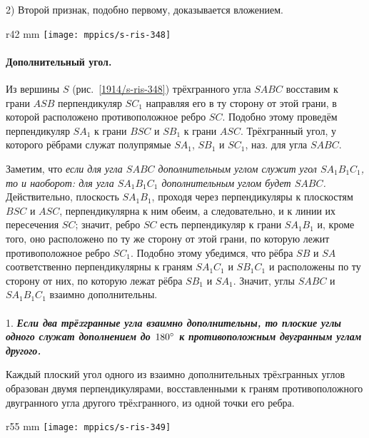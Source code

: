 2) Второй признак, подобно первому, доказывается вложением.

\begin{wrapfigure}{r}{42 mm}
\vskip0mm
\centering
\texttt{[image: mppics/s-ris-348]}
\caption{}\label{1914/s-ris-348}
\end{wrapfigure}

\paragraph{Дополнительный угол.}\label{1914/399}
Из вершины $S$ (рис.~\ref{1914/s-ris-348}) трёхгранного угла $SABC$ восставим к грани $ASB$ перпендикуляр $SC_1$ направляя его в ту сторону от этой грани, в которой расположено противоположное ребро $SC$.
Подобно этому проведём перпендикуляр $SA_1$ к грани $BSC$ и $SB_1$ к грани $ASC$. Трёхгранный угол, у которого рёбрами служат полупрямые $SA_1$, $SB_1$ и $SC_1$, наз.  для угла $SABC$.

Заметим, что \emph{если для угла $SABC$ дополнительным углом служит угол $SA_1B_1C_1$, то и наоборот: для угла $SA_1B_1C_1$ дополнительным углом будет $SABC$.}
Действительно, плоскость $SA_1B_1$, проходя через перпендикуляры к плоскостям $BSC$ и $ASC$, перпендикулярна к ним обеим, а следовательно, и к линии их пересечения $SC$; значит, ребро $SC$ есть перпендикуляр к грани $SA_1B_1$ и, кроме того, оно расположено по ту же сторону от этой грани, по которую лежит противоположное ребро $SC_1$.
Подобно этому убедимся, что рёбра $SB$ и $SA$ соответственно перпендикулярны к граням $SA_1C_1$ и $SB_1C_1$ и расположены по ту сторону от них, по которую лежат рёбра $SB_1$ и $SA_1$.
Значит, углы $SABC$ и $SA_1B_1C_1$ взаимно дополнительны.

\paragraph{}\label{1914/400}
 1.
\textbf{\emph{Если два трёxгранные угла взаимно дополнительны, то плоские углы одного служат дополнением до $180\degree$ к противоположным двугранным углам другого.}}

Каждый плоский угол одного из взаимно дополнительных трёxгранных углов образован двумя перпендикулярами, восставленными к граням противоположного двугранного угла другого трёxгранного, из одной точки его ребра.

\begin{wrapfigure}{r}{55 mm}
\vskip-4mm
\centering
\texttt{[image: mppics/s-ris-349]}
\caption{}\label{1914/s-ris-349}
\end{wrapfigure}

